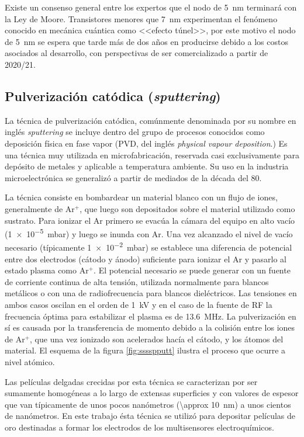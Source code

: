 		Existe un consenso general entre los expertos que el nodo de \SI{5}{\nm} terminará con la Ley de Moore. Transistores menores que \SI{7}{\nm} experimentan el fenómeno conocido en mecánica cuántica como <<efecto túnel>>, por este motivo el nodo de \SI{5}{\nm} se espera que tarde más de dos años en producirse debido a los costos asociados al desarrollo, con perspectivas de ser comercializado a partir de 2020/21. \cite{samsungnewsroom,ibm2017}

	\subsection{Pulverización catódica (\textit{sputtering})}
				
		La técnica de pulverización catódica, comúnmente denominada por su nombre en inglés \textit{sputtering} se incluye dentro del grupo de procesos conocidos como deposición física en fase vapor (PVD, del inglés \textit{physical vapour deposition}.) Es una técnica muy utilizada en microfabricación, reservada casi exclusivamente para depósito de metales y aplicable a temperatura ambiente. Su uso en la industria microelectrónica se generalizó a partir de mediados de la década del 80.\cite{Depla2010,Kelly2000}

		La técnica consiste en bombardear un material blanco con un flujo de iones, generalmente de Ar$^+$, que luego son depositados sobre el material utilizado como sustrato. Para ionizar el Ar primero se evacúa la cámara del equipo en alto vacío (\SI{1e-5}{\milli\bar}) y luego se inunda con Ar. Una vez alcanzado el nivel de vacío necesario (típicamente \SI{1e-2}{\milli\bar}) se establece una diferencia de potencial entre dos electrodos (cátodo y ánodo) suficiente para ionizar el Ar y pasarlo al estado plasma como Ar$^{+}$. El potencial necesario se puede generar con un fuente de corriente continua de alta tensión, utilizada normalmente para blancos metálicos o con una de radiofrecuencia para blancos dieléctricos. Las tensiones en ambos casos oscilan en el orden de \SI{1}{\kilo\volt} y en el caso de la fuente de RF la frecuencia óptima para estabilizar el plasma es de \SI{13.6}{\mega\hertz}. La pulverización en sí es causada por la transferencia de momento debido a la colisión entre los iones de Ar$^+$, que una vez ionizado son acelerados hacía el cátodo, y los átomos del material. El esquema de la figura \ref{fig:sssspputt} ilustra el proceso que ocurre a nivel atómico. \cite{Behrisch1981,sigmund1968,Bhatt2007}
	
		Las películas delgadas crecidas por esta técnica se caracterizan por ser sumamente homogéneas a lo largo de extensas superficies y con valores de espesor que van típicamente de unos pocos nanómetros (\SI{\approx 10}{\nm}) a unos cientos de nanómetros. En este trabajo ésta técnica se utilizó para depositar películas de oro destinadas a formar los electrodos de los multisensores electroquímicos.

